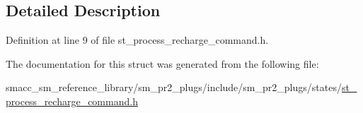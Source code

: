 \subsection{Detailed Description}


Definition at line 9 of file st\+\_\+process\+\_\+recharge\+\_\+command.\+h.



The documentation for this struct was generated from the following file\+:\begin{DoxyCompactItemize}
\item 
smacc\+\_\+sm\+\_\+reference\+\_\+library/sm\+\_\+pr2\+\_\+plugs/include/sm\+\_\+pr2\+\_\+plugs/states/\hyperlink{st__process__recharge__command_8h}{st\+\_\+process\+\_\+recharge\+\_\+command.\+h}\end{DoxyCompactItemize}
